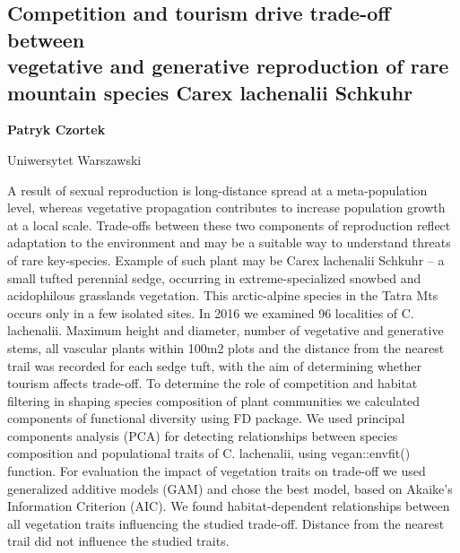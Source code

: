 \documentclass[\main/boa.tex]{subfiles}
\begin{document}
\subsection[Competition and tourism drive trade-off between vegetative and generative \\ reproduction of rare mountain species Carex lachenalii Schkuhr]{Competition and tourism drive trade-off between \\ vegetative and generative reproduction of rare \\ mountain species Carex lachenalii Schkuhr}

\begin{minipage}{0.915\textwidth}
	\centering
  {\bf {} Patryk Czortek}
\end{minipage}


\begin{affiliations}
\begin{minipage}{0.915\textwidth}
\centering
Uniwersytet Warszawski  \\[-2pt]
\end{minipage}
\end{affiliations}

\vskip 0.3cm

 A result of sexual reproduction is long-distance spread at a meta-population level, whereas vegetative propagation contributes to increase population growth at a local scale. Trade-offs between these two components of reproduction reflect adaptation to the environment and may be a suitable way to understand threats of rare key-species. Example of such plant may be Carex lachenalii Schkuhr – a small tufted perennial sedge, occurring in extreme-specialized snowbed and acidophilous grasslands vegetation. This arctic-alpine species in the Tatra Mts occurs only in a few isolated sites. In 2016 we examined 96 localities of C. lachenalii. Maximum height and diameter, number of vegetative and generative stems, all vascular plants within 100m2 plots and the distance from the nearest trail was recorded for each sedge tuft, with the aim of determining whether tourism affects trade-off. To determine the role of competition and habitat filtering in shaping species composition of plant communities we calculated components of functional diversity using FD package. We used principal components analysis (PCA) for detecting relationships between species composition and populational traits of C. lachenalii, using vegan::envfit() function. For evaluation the impact of vegetation traits on trade-off we used generalized additive models (GAM) and chose the best model, based on Akaike’s Information Criterion (AIC). We found habitat-dependent relationships between all vegetation traits influencing the studied trade-off. Distance from the nearest trail did not influence the studied traits. 
\end{document}
